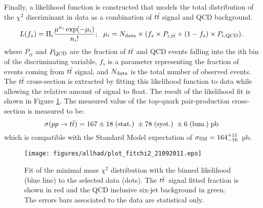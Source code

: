 Finally, a likelihood function is constructed that models the total distribution of the $\chi^2$ discriminant in data
as a combination of $\ttbar$ signal and QCD background.
\begin{equation}
L(f_s) = \Pi_{i} \frac{ \mu^{n_{i}} \exp(-\mu_i) }{n_{i}!}; \ \  \mu_{i} = N_{{\rm data}} \times ( f_s \times P_{i,t\bar{t}}  + (1 - f_{s}) \times P_{i,{\rm QCD}}).
\end{equation}
where $P_{t\bar{t}}$ and $P_{{\rm QCD}}$ are the fraction of $\ttbar$ and QCD events falling into the ith bin of the discriminating variable, 
$f_s$ is a parameter representing the fraction of events coming from $\ttbar$ signal, 
and $N_{{\rm data}}$ is the total number of observed events.
The $\ttbar$ cross-section is extracted by fitting this likelihood function to data while allowing the relative amount of signal to float.
The result of the likelihood fit is shown in Figure \ref{fig:fitchi2_3_Jet.eps}. 
The measured value of the top-quark pair-production cross-section is measured to be:
\begin{equation*}
 \sigma {(pp \to t\bar{t})} = 167 \pm 18 \; {\rm (stat.)} \; \pm 78 \; {\rm (syst.)} \;  \pm 6 \;  {\rm (lum.)} \; {\rm pb}
\end{equation*}
which is compatible with the Standard Model expectation of  $\sigma_{{\rm SM}} = 164^{+11} _{-16}$~pb.



\begin{figure}[h!]
  \begin{center}
    \texttt{[image: figures/allhad/plot\_fitchi2\_21092011.eps]}
  \end{center}
  \caption{Fit of the minimal mass $\chi^2$ distribution with the binned likelihood (blue line) to the selected data (dots). The $\ttbar$~signal fitted fraction is shown in red and the QCD inclusive six-jet background  in green. The errors bars associated to the data are statistical only.}
  \label{fig:fitchi2_3_Jet.eps}
\end{figure}



